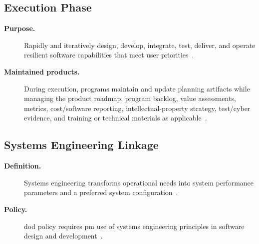 \documentclass[../main.tex]{subfiles}
\begin{document}
\subsection{Execution Phase}
\begin{description}
  \item[\textbf{Purpose.}] Rapidly and iteratively design, develop, integrate, test, deliver, and operate resilient software capabilities that meet user priorities~\autocite{edo-3-4-2-software-acquisition-management-2025,DoDI5000-87}.
  \item[\textbf{Maintained products.}] During execution, programs maintain and update planning artifacts while managing the product roadmap, program backlog, value assessments, metrics, cost/software reporting, intellectual-property strategy, test/cyber evidence, and training or technical materials as applicable~\autocite{edo-3-4-2-software-acquisition-management-2025,DoDI5000-87}.
\end{description}

\subsection{Systems Engineering Linkage}
\begin{description}
  \item[\textbf{Definition.}] Systems engineering transforms operational needs into system performance parameters and a preferred system configuration~\autocite{edo-3-4-2-software-acquisition-management-2025}.
  \item[\textbf{Policy.}] \ac{dod} policy requires \ac{pm} use of systems engineering principles in software design and development~\autocite{edo-3-4-2-software-acquisition-management-2025}.
\end{description}
\end{document}
